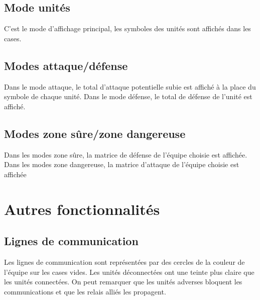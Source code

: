 		\subsection{Mode unités}

			C'est le mode d'affichage principal, les symboles des unités sont affichés dans les cases.

			\clearpage

		\subsection{Modes attaque/défense}

			Dans le mode attaque, le total d'attaque potentielle subie est affiché à la place du symbole de chaque unité.
			Dans le mode défense, le total de défense de l'unité est affiché.
		
			\clearpage	

		\subsection{Modes zone sûre/zone dangereuse}
			Dans les modes zone sûre, la matrice de défense de l'équipe choisie est affichée.
			Dans les modes zone dangereuse, la matrice d'attaque de l'équipe choisie est affichée

			\clearpage

	\section{Autres fonctionnalités}

		\subsection{Lignes de communication}

			Les lignes de communication sont représentées par des cercles de la couleur de l'équipe sur les cases vides.
			Les unités déconnectées ont une teinte plus claire que les unités connectées.
			On peut remarquer que les unités adverses bloquent les communications et que les relais alliés les propagent.

			\clearpage
